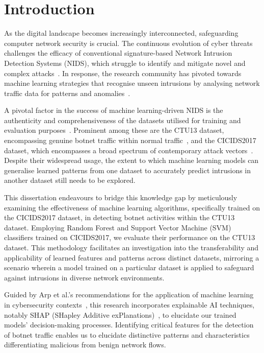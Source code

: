 \chapter{Introduction}

As the digital landscape becomes increasingly interconnected, safeguarding computer network security is crucial. The continuous evolution of cyber threats challenges the efficacy of conventional signature-based Network Intrusion Detection Systems (NIDS), which struggle to identify and mitigate novel and complex attacks~\cite{marchetti2016analysis}. In response, the research community has pivoted towards machine learning strategies that recognise unseen intrusions by analysing network traffic data for patterns and anomalies~\cite{buczak2015survey}.

A pivotal factor in the success of machine learning-driven NIDS is the authenticity and comprehensiveness of the datasets utilised for training and evaluation purposes~\cite{engelen2021troubleshooting}. Prominent among these are the CTU13 dataset, encompassing genuine botnet traffic within normal traffic~\cite{garcia2014empirical}, and the CICIDS2017 dataset, which encompasses a broad spectrum of contemporary attack vectors~\cite{sharafaldin2018toward}. Despite their widespread usage, the extent to which machine learning models can generalise learned patterns from one dataset to accurately predict intrusions in another dataset still needs to be explored.

This dissertation endeavours to bridge this knowledge gap by meticulously examining the effectiveness of machine learning algorithms, specifically trained on the CICIDS2017 dataset, in detecting botnet activities within the CTU13 dataset. Employing Random Forest and Support Vector Machine (SVM) classifiers trained on CICIDS2017, we evaluate their performance on the CTU13 dataset. This methodology facilitates an investigation into the transferability and applicability of learned features and patterns across distinct datasets, mirroring a scenario wherein a model trained on a particular dataset is applied to safeguard against intrusions in diverse network environments.

Guided by Arp et al.'s recommendations for the application of machine learning in cybersecurity contexts~\cite{arp2022and}, this research incorporates explainable AI techniques, notably SHAP (SHapley Additive exPlanations)~\cite{lundberg2017unified}, to elucidate our trained models' decision-making processes. Identifying critical features for the detection of botnet traffic enables us to elucidate distinctive patterns and characteristics differentiating malicious from benign network flows.

